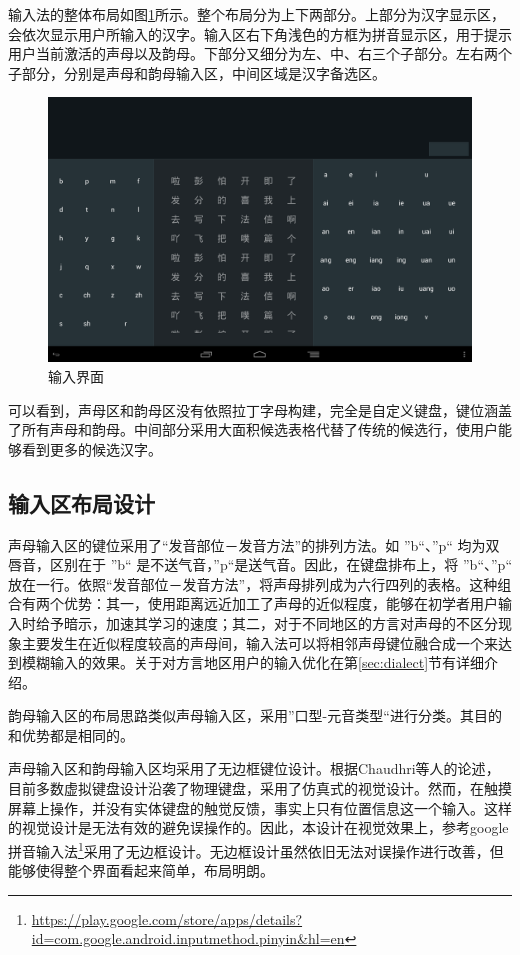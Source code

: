   输入法的整体布局如图\ref{fig:layout1_background}所示。整个布局分为上下两部分。上部分为汉字显示区，会依次显示用户所输入的汉字。输入区右下角浅色的方框为拼音显示区，用于提示用户当前激活的声母以及韵母。下部分又细分为左、中、右三个子部分。左右两个子部分，分别是声母和韵母输入区，中间区域是汉字备选区。

  \begin{figure}[h]
  \noindent\includegraphics[width=150mm]{img/layout1_background}
  \caption{输入界面}
  \label{fig:layout1_background}
  \end{figure}

  可以看到，声母区和韵母区没有依照拉丁字母构建，完全是自定义键盘，键位涵盖了所有声母和韵母。中间部分采用大面积候选表格代替了传统的候选行，使用户能够看到更多的候选汉字。

  \subsection{输入区布局设计}

  声母输入区的键位采用了“发音部位－发音方法”的排列方法。如 ”b“、”p“ 均为双唇音，区别在于 ”b“ 是不送气音，”p“是送气音。因此，在键盘排布上，将 ”b“、”p“ 放在一行。依照“发音部位－发音方法”，将声母排列成为六行四列的表格。这种组合有两个优势：其一，使用距离远近加工了声母的近似程度，能够在初学者用户输入时给予暗示，加速其学习的速度；其二，对于不同地区的方言对声母的不区分现象主要发生在近似程度较高的声母间，输入法可以将相邻声母键位融合成一个来达到模糊输入的效果。关于对方言地区用户的输入优化在第\ref{sec:dialect}节有详细介绍。

  韵母输入区的布局思路类似声母输入区，采用”口型-元音类型“进行分类。其目的和优势都是相同的。

  声母输入区和韵母输入区均采用了无边框键位设计。根据Chaudhri等人的论述\supercite{chaudhri}，目前多数虚拟键盘设计沿袭了物理键盘，采用了仿真式的视觉设计。然而，在触摸屏幕上操作，并没有实体键盘的触觉反馈，事实上只有位置信息这一个输入。这样的视觉设计是无法有效的避免误操作的。因此，本设计在视觉效果上，参考google拼音输入法\footnote{\url{https://play.google.com/store/apps/details?id=com.google.android.inputmethod.pinyin&hl=en}}采用了无边框设计。无边框设计虽然依旧无法对误操作进行改善，但能够使得整个界面看起来简单，布局明朗。

